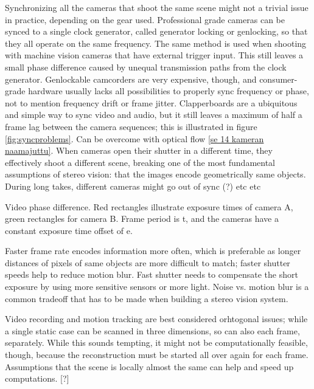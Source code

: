 Synchronizing all the cameras that shoot the same scene might not a trivial issue in practice, depending on the gear used.
Professional grade cameras can be synced to a single clock generator, called generator locking or genlocking, so that they all operate on the same frequency.
The same method is used when shooting with machine vision cameras that have external trigger input.
This still leaves a small phase difference caused by unequal transmission paths from the clock generator.
Genlockable camcorders are very expensive, though, and consumer-grade hardware usually lacks all possibilities to properly sync frequency or phase, not to mention frequency drift or frame jitter.
Clapperboards are a ubiquitous and simple way to sync video and audio, but it still leaves a maximum of half a frame lag between the camera sequences; this is illustrated in figure \ref{fig:syncproblems}. Can be overcome with optical flow \ref{se 14 kameran naamajuttu}.
When cameras open their shutter in a different time, they effectively shoot a different scene, breaking one of the most fundamental assumptions of stereo vision: that the images encode geometrically same objects.
During long takes, different cameras might go out of sync (?) etc etc

{Video phase difference. Red rectangles illustrate exposure times of camera A, green rectangles for camera B. Frame period is t, and the cameras have a constant exposure time offset of e.}

Faster frame rate encodes information more often, which is preferable as longer distances of pixels of same objects are more difficult to match; faster shutter speeds help to reduce motion blur.
Fast shutter needs to compensate the short exposure by using more sensitive sensors or more light.
Noise vs. motion blur is a common tradeoff that has to be made when building a stereo vision system.

Video recording and motion tracking are best considered orhtogonal issues; while a single static case can be scanned in three dimensions, so can also each frame, separately. While this sounds tempting, it might not be computationally feasible, though, because the reconstruction must be started all over again for each frame. Assumptions that the scene is locally almost the same can help and speed up computations. [?]
